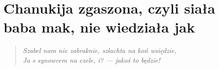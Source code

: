 
\chapter{Chanukija zgaszona, czyli siała baba mak, nie wiedziała jak}

\begin{quote}
    \itshape
    \small
    Szabel nam nie zabraknie, szlachta na koń \mbox{wsiędzie}, \\
    Ja s synowcem na czele, i? — jakoś to będzie!  
\end{quote}


